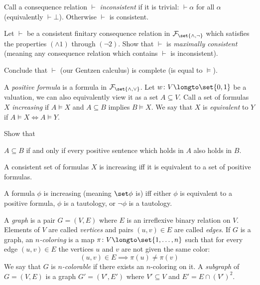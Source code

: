     Call a consequence relation $\vdash$ {\it inconsistent} if it is trivial: $\vdash\alpha$ for
    all $\alpha$ (equivalently $\vdash\bot$).
    Otherwise $\vdash$ is consistent.

    \benum
        \item Let $\vdash$ be a consistent finitary consequence relation in
        ${\cal F}_{\set{{\land},{\neg}}}$ which satisfies the properties $(\land1)$ through
        $(\neg2)$.
        Show that $\vdash$ is {\it maximally consistent} (meaning any consequence relation which
        contains $\vdash$ is inconsistent).
        \item Conclude that $\vdash$ (our Gentzen calculus) is complete (is equal to $\vDash$).
    \eenum

\eprob

\bprob

    A {\it positive formula} is a formula in ${\cal F}_{\set{{\land},{\lor}}}$.
    Let $w\colon V\longto\set{0,1}$ be a valuation, we can also equivalently view it as a set
    $A\subseteq V$.
    Call a set of formulas $X$ {\it increasing} if $A\vDash X$ and $A\subseteq B$ implies
    $B\vDash X$.
    We say that $X$ is {\it equivalent} to $Y$ if $A\vDash X\iff A\vDash Y$.

    Show that
    \benum
        \item $A\subseteq B$ if and only if every positive sentence which holds in $A$ also holds
        in $B$.
        \item A consistent set of formulas $X$ is increasing iff it is equivalent to a set of
        positive formulas.
        \item A formula $\phi$ is increasing (meaning $\set\phi$ is) iff either $\phi$ is
        equivalent to a positive formula, $\phi$ is a tautology, or $\neg\phi$ is a tautology.
    \eenum

\eprob

\bprob

    A {\it graph} is a pair $G=(V,E)$ where $E$ is an irreflexive binary relation on $V$.
    Elements of $V$ are called {\it vertices} and pairs $(u,v)\in E$ are called {\it edges}.
    If $G$ is a graph, an {\it $n$-coloring} is a map $\pi\colon V\longto\set{1,\dots,n}$ such that for every edge $(u,v)\in E$ the vertices $u$ and $v$ are not given the same color:
    $$ (u,v)\in E\implies \pi(u)\neq\pi(v) $$
    We say that $G$ is {\it $n$-colorable} if there exists an $n$-coloring on it.
    A {\it subgraph} of $G=(V,E)$ is a graph $G'=(V',E')$ where $V'\subseteq V$ and $E'=E\cap(V')^2$.

